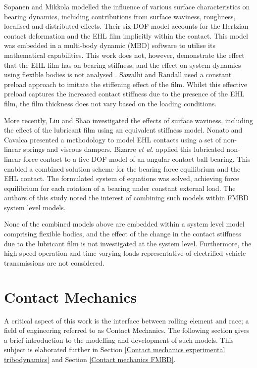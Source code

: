 Sopanen and Mikkola \cite{Sopanen2003_1} modelled the influence of various surface characteristics on bearing dynamics, including contributions from surface waviness, roughness, localised and distributed effects. Their six-DOF model accounts for the Hertzian contact deformation and the EHL film implicitly within the contact. This model was embedded in a multi-body dynamic (MBD) software to utilise its mathematical capabilities. This work does not, however, demonstrate the effect that the EHL film has on bearing stiffness, and the effect on system dynamics using flexible bodies is not analysed \cite{Sopanen2003_2}. Sawalhi and Randall \cite{Sawalhi2008} used a constant preload approach to imitate the stiffening effect of the film. Whilst this effective preload captures the increased contact stiffness due to the presence of the EHL film, the film thickness does not vary based on the loading conditions.

More recently, Liu and Shao \cite{Liu2017b} investigated the effects of surface waviness, including the effect of the lubricant film using an equivalent stiffness model. Nonato and Cavalca \cite{Nonato2014} presented a methodology to model EHL contacts using a set of non-linear springs and viscous dampers. Bizarre \textit{et al.} \cite{Bizarre2018} applied this lubricated non-linear force contact to a five-DOF model of an angular contact ball bearing. This enabled a combined solution scheme for the bearing force equilibrium and the EHL contact. The formulated system of equations was solved, achieving force equilibrium for each rotation of a bearing under constant external load. The authors of this study noted the interest of combining such models within FMBD system level models.

None of the combined models above are embedded within a system level model comprising flexible bodies, and the effect of the change in the contact stiffness due to the lubricant film is not investigated at the system level. Furthermore, the high-speed operation and time-varying loads representative of electrified vehicle transmissions are not considered.

\section{Contact Mechanics}
A critical aspect of this work is the interface between rolling element and race; a field of engineering referred to as Contact Mechanics. The following section gives a brief introduction to the modelling and development of such models. This subject is elaborated further in Section \ref{Contact mechanics experimental tribodynamics} and Section \ref{Contact mechanics FMBD}.

